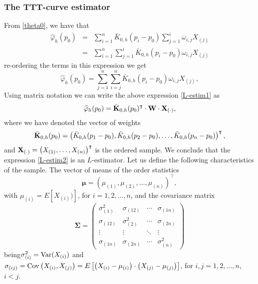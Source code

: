 \documentclass[preprint,12pt]{elsarticle}
\begin{document}
\subsubsection*{The TTT-curve estimator}
\noindent From \eqref{theta0}, we have that
\begin{eqnarray*}
\widehat{\varphi}_h(p_0)&=&\sum_{i=1}^n \bar{K}_{0,h}(p_i-p_0)\sum_{j=1}^i\omega_{i,j}X_{(j)} \\
&=& \sum_{i=1}^n \sum_{j=1}^i \bar{K}_{0,h}(p_i-p_0)\omega_{i,j}X_{(j)} 
\end{eqnarray*}
re-ordering the terms in this expression we get
\begin{equation}\label{L-estim1}
\widehat{\varphi}_h(p_0)=  \sum_{j=1}^n \sum_{i=j}^n \bar{K}_{0,h}(p_i-p_0)\omega_{i,j}X_{(j)}, 
\end{equation}
Using matrix notation we can write the above expression \eqref{L-estim1} as 
\begin{equation}\label{L-estim2}
\widehat{\varphi}_h(p_0)=  \bar{\bf K}_{0,h}(p_0)^{\intercal} \cdot {\bf W} \cdot{\bf X}_{(\cdot)}, 
\end{equation}
where we have denoted the vector of weights 
$$\bar{\bf K}_{0,h}(p_0)=\left(\bar{K}_{0,h}(p_1-p_0), \bar{K}_{0,h}(p_2-p_0),\ldots,\bar{ K}_{0,h}(p_n-p_0)\right)^{\intercal},$$ and ${\bf X}_{(\cdot)}=\left(X_{(1)},\ldots,X_{(n)}\right)^{\intercal}$ is the ordered sample. 
%
\vskip0.3cm
We conclude that the expression \eqref{L-estim2} is an $L$-estimator. Let us define the following characteristics of the sample. 
 The vector of means of the order statistics 
\begin{equation}\label{mean}
\boldsymbol{\mu}=\left({\mu}_{(1)},{\mu}_{(2)},\ldots,{\mu}_{(n)}\right)^{\intercal}, 
\end{equation}
with $\mu_{(i)}=E\left[X_{(i)})\right]$, for $i=1,2,\ldots,n$, and the covariance matrix 
\begin{equation}\label{var}
{\boldsymbol{\Sigma}}=\left(\begin{array}{cccc}
\sigma_{(1)}^2 & \sigma_{(12)} & \cdots & \sigma_{(1n)} \\
\sigma_{(12)} & \sigma_{(2)}^2 & \cdots & \sigma_{(2n)} \\
\vdots & \vdots & \ddots & \vdots \\
\sigma_{(1n)} & \sigma_{(2n)} & \cdots & \sigma_{(n)}^2
\end{array}\right)
\end{equation}
being$\sigma_{(i)}^2={\rm Var}(X_{(i)})$ and $\sigma_{(ij)}={\rm Cov} \left(X_{(i)},X_{(j)} \right)=E\left[\left(X_{(i)}-\mu_{(i)}\right)\cdot\left(X_{(j)}-\mu_{(j)} \right)\right]$, for $i, j= 1,2,\ldots,n$, $i<j$.
\end{document}

